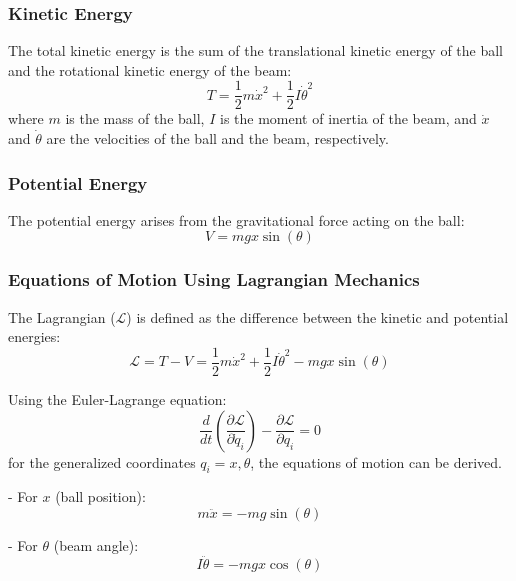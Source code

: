 \documentclass[conference]{IEEEtran}
\begin{document}
\subsubsection{Kinetic Energy}
\label{subsubsec:model_lag_kinetic}
The total kinetic energy is the sum of the translational kinetic energy of the ball and the rotational kinetic energy of the beam:
\begin{equation}
T = \frac{1}{2} m \dot{x}^2 + \frac{1}{2} I \dot{\theta}^2
\end{equation}
where \(m\) is the mass of the ball, \(I\) is the moment of inertia of the beam, and \(\dot{x}\) and \(\dot{\theta}\) are the velocities of the ball and the beam, respectively.

\subsubsection{Potential Energy}
\label{subsubsec:model_lag_potential}
The potential energy arises from the gravitational force acting on the ball:
\begin{equation}
V = m g x \sin(\theta)
\end{equation}

\subsubsection{Equations of Motion Using Lagrangian Mechanics}
\label{subsubsec:model_lag_eq}
The Lagrangian (\(\mathcal{L}\)) is defined as the difference between the kinetic and potential energies:
\begin{equation}
\mathcal{L} = T - V = \frac{1}{2} m \dot{x}^2 + \frac{1}{2} I \dot{\theta}^2 - m g x \sin(\theta)
\end{equation}

Using the Euler-Lagrange equation:
\begin{equation}
\frac{d}{dt} \left( \frac{\partial \mathcal{L}}{\partial \dot{q}_i} \right) - \frac{\partial \mathcal{L}}{\partial q_i} = 0
\end{equation}
for the generalized coordinates \(q_i = x, \theta\), the equations of motion can be derived.

- For \(x\) (ball position):
\begin{equation}
m \ddot{x} = -m g \sin(\theta)
\end{equation}

- For \(\theta\) (beam angle):
\begin{equation}
I \ddot{\theta} = -m g x \cos(\theta)
\end{equation}
\end{document}
